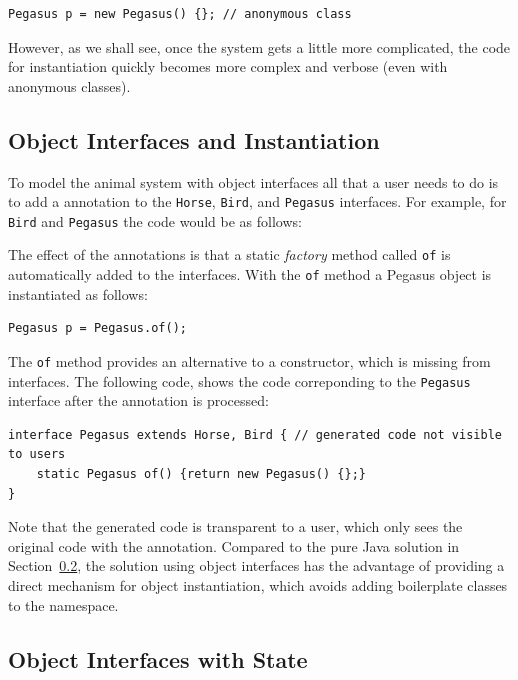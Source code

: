 \begin{lstlisting}
Pegasus p = new Pegasus() {}; // anonymous class
\end{lstlisting}

\noindent However, as we shall see, once the system gets a little more
complicated, the code for instantiation quickly becomes more 
complex and verbose (even with anonymous classes). 

\subsection{Object Interfaces and Instantiation} 

To model the animal system with object interfaces all that a user
needs to do is to add a \mixin annotation to the \texttt{Horse}, 
\texttt{Bird}, and \texttt{Pegasus} interfaces.  For example, 
for \texttt{Bird} and \texttt{Pegasus} the code would be as follows: 


The effect of the annotations is that a static \emph{factory} method called
\texttt{of} is automatically added to the interfaces. With the
\texttt{of} method a Pegasus object is instantiated as follows:

\begin{lstlisting}
Pegasus p = Pegasus.of();
\end{lstlisting}

\noindent The \texttt{of} method provides an alternative to a
constructor, which is missing from interfaces. The following code,
shows the code correponding to the \texttt{Pegasus} interface
after the \mixin annotation is processed:

\begin{lstlisting}
interface Pegasus extends Horse, Bird { // generated code not visible to users
	static Pegasus of() {return new Pegasus() {};}
}
\end{lstlisting}

\noindent Note that the generated code is transparent to a user, which
only sees the original code with the \mixin annotation. Compared to the pure
Java solution in Section~\ref{}, the solution using object interfaces
has the advantage of providing a direct mechanism for object
instantiation, which avoids adding boilerplate classes to the
namespace. 

\subsection{Object Interfaces with State}

